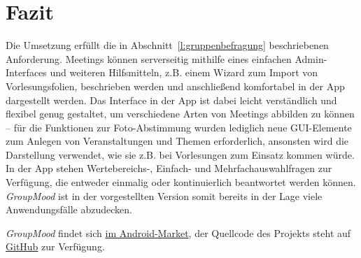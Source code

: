 \section{Fazit}

Die Umsetzung erfüllt die in Abschnitt~\ref{l:gruppenbefragung} beschriebenen Anforderung. Meetings können serverseitig mithilfe eines einfachen Admin-Interfaces und weiteren Hilfsmitteln, z.B. einem Wizard zum Import von Vorlesungsfolien, beschrieben werden und anschließend komfortabel in der App dargestellt werden. Das Interface in der App ist dabei leicht verständlich und flexibel genug gestaltet, um verschiedene Arten von Meetings abbilden zu können -- für die Funktionen zur Foto-Abstimmung wurden lediglich neue GUI-Elemente zum Anlegen von Veranstaltungen und Themen erforderlich, ansonsten wird die Darstellung verwendet, wie sie z.B. bei Vorlesungen zum Einsatz kommen würde. In der App stehen Wertebereichs-, Einfach- und Mehrfachauswahlfragen zur Verfügung, die entweder einmalig oder kontinuierlich beantwortet werden können. \emph{GroupMood} ist in der vorgestellten Version somit bereits in der Lage viele Anwendungsfälle abzudecken.

\bigskip

\emph{GroupMood} findet sich \href{https://market.android.com/details?id=de.hsrm.mi.mobcomp.y2k11grp04}{im Android-Market}, der Quellcode des Projekts steht auf \href{https://github.com/tacker/GroupMood}{GitHub} zur Verfügung.